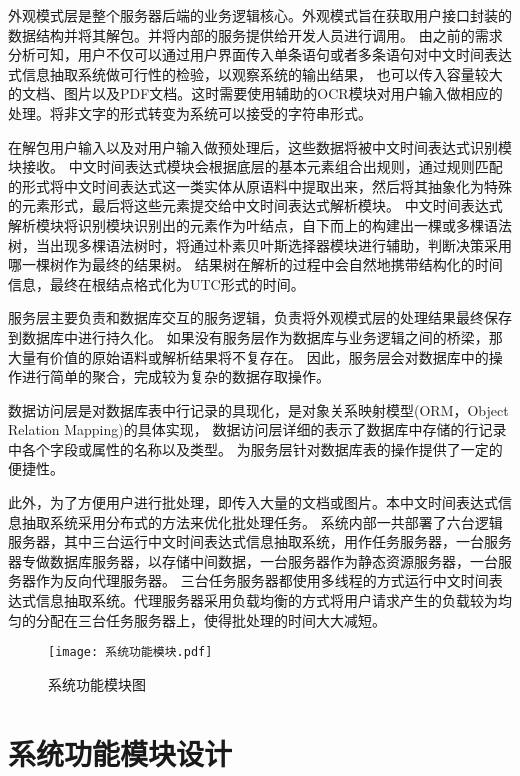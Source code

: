 外观模式层是整个服务器后端的业务逻辑核心。外观模式旨在获取用户接口封装的数据结构并将其解包。并将内部的服务提供给开发人员进行调用。
由之前的需求分析可知，用户不仅可以通过用户界面传入单条语句或者多条语句对中文时间表达式信息抽取系统做可行性的检验，以观察系统的输出结果，
也可以传入容量较大的文档、图片以及PDF文档。这时需要使用辅助的OCR模块对用户输入做相应的处理。将非文字的形式转变为系统可以接受的字符串形式。

在解包用户输入以及对用户输入做预处理后，这些数据将被中文时间表达式识别模块接收。
中文时间表达式模块会根据底层的基本元素组合出规则，通过规则匹配的形式将中文时间表达式这一类实体从原语料中提取出来，然后将其抽象化为特殊的元素形式，最后将这些元素提交给中文时间表达式解析模块。
中文时间表达式解析模块将识别模块识别出的元素作为叶结点，自下而上的构建出一棵或多棵语法树，当出现多棵语法树时，将通过朴素贝叶斯选择器模块进行辅助，判断决策采用哪一棵树作为最终的结果树。
结果树在解析的过程中会自然地携带结构化的时间信息，最终在根结点格式化为UTC形式的时间。

服务层主要负责和数据库交互的服务逻辑，负责将外观模式层的处理结果最终保存到数据库中进行持久化。
如果没有服务层作为数据库与业务逻辑之间的桥梁，那大量有价值的原始语料或解析结果将不复存在。
因此，服务层会对数据库中的操作进行简单的聚合，完成较为复杂的数据存取操作。

数据访问层是对数据库表中行记录的具现化，是对象关系映射模型(ORM，Object Relation Mapping)的具体实现，
数据访问层详细的表示了数据库中存储的行记录中各个字段或属性的名称以及类型。
为服务层针对数据库表的操作提供了一定的便捷性。

此外，为了方便用户进行批处理，即传入大量的文档或图片。本中文时间表达式信息抽取系统采用分布式的方法来优化批处理任务。
系统内部一共部署了六台逻辑服务器，其中三台运行中文时间表达式信息抽取系统，用作任务服务器，一台服务器专做数据库服务器，以存储中间数据，一台服务器作为静态资源服务器，一台服务器作为反向代理服务器。
三台任务服务器都使用多线程的方式运行中文时间表达式信息抽取系统。代理服务器采用负载均衡的方式将用户请求产生的负载较为均匀的分配在三台任务服务器上，使得批处理的时间大大减短。

\begin{figure}[b]
  \centering
  \texttt{[image: 系统功能模块.pdf]}
  \caption{系统功能模块图}
  \label{fig:system_feature}
\end{figure}

\section{系统功能模块设计}

